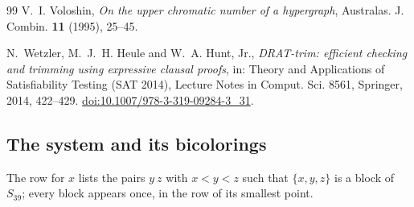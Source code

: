 \documentclass[11pt]{article}
\theoremstyle{definition}
\begin{document}
\begin{thebibliography}{99}
V.~I. Voloshin, \emph{On the upper chromatic number of a hypergraph},
Australas. J. Combin. \textbf{11} (1995), 25--45.

N.~Wetzler, M.~J.~H. Heule and W.~A. Hunt, Jr., \emph{DRAT-trim: efficient
checking and trimming using expressive clausal proofs}, in: Theory and
Applications of Satisfiability Testing (SAT 2014), Lecture Notes in
Comput. Sci. 8561, Springer, 2014, 422--429.
\href{https://doi.org/10.1007/978-3-319-09284-3_31}{doi:10.1007/978-3-319-09284-3\_31}.

\end{thebibliography}

\begin{appendices}
\section{The system and its bicolorings}\label{app:data}

The row for $x$ lists the pairs $y~z$ with $x<y<z$ such that
$\{x,y,z\}$ is a block of $S_{39}$; every block appears once, in the row
of its smallest point.


\end{appendices}
\end{document}
